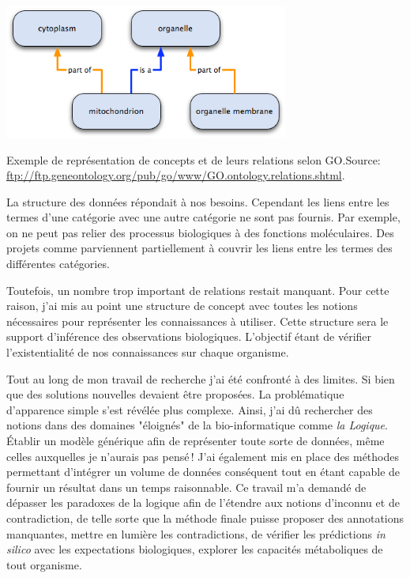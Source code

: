 \begin{refsegment}
\begin{shadedfigure}[H]
    \centering
    \includegraphics[width=0.7\textwidth]{img/dag_go_relation.png}
    \caption{Exemple de représentation de concepts et de leurs relations selon \gls{GO}.\hspace{\textwidth}\tiny{Source: \url{ftp://ftp.geneontology.org/pub/go/www/GO.ontology.relations.shtml}.}}
    \label{fig:go_relation}
\end{shadedfigure}


La structure des données répondait à nos besoins. Cependant les liens entre les termes d'une catégorie avec une autre catégorie ne sont pas fournis. Par exemple, on ne peut pas relier des processus biologiques à des fonctions moléculaires. Des projets comme \cite{AdditionalGO2006} parviennent partiellement à couvrir les liens  entre les termes des différentes catégories.

Toutefois, un nombre trop important de relations restait manquant. Pour cette raison, j'ai mis au point une structure de concept avec toutes les notions nécessaires pour représenter les connaissances à utiliser. Cette structure sera le support d'inférence des observations biologiques. L'objectif étant de vérifier l'existentialité de nos connaissances sur chaque organisme.

Tout au long de mon travail de recherche j'ai été confronté à des limites. Si bien que des solutions nouvelles devaient être proposées. La problématique d'apparence simple s'est révélée plus complexe. Ainsi, j'ai dû rechercher des notions dans des domaines "éloignés" de la bio-informatique comme \textit{la Logique}. Établir un modèle générique afin de représenter toute sorte de données, même celles auxquelles je n'aurais pas pensé ! J'ai également mis en place des méthodes permettant d'intégrer un volume de données conséquent tout en étant capable de fournir un résultat dans un temps raisonnable. Ce travail m'a demandé de dépasser les paradoxes de la logique afin de l'étendre aux notions d'inconnu et de contradiction, de telle sorte que la méthode finale puisse proposer des annotations manquantes, mettre en lumière les contradictions, de vérifier les prédictions \textit{in silico} avec les expectations biologiques, explorer les capacités métaboliques de tout organisme.


\end{refsegment}
